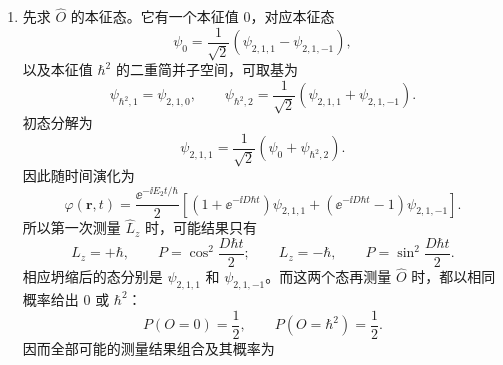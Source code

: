 \begin{question}
\begin{solution}
\begin{enumerate}[label=(\arabic*),leftmargin=2.5em]
  \item 先求 $\hat O$ 的本征态。它有一个本征值 $0$，对应本征态
  \[
  \psi_{0}=\frac{1}{\sqrt2}(\psi_{2,1,1}-\psi_{2,1,-1}),
  \]
  以及本征值 $\hbar^2$ 的二重简并子空间，可取基为
  \[
  \psi_{\hbar^2,1}=\psi_{2,1,0},
  \qquad
  \psi_{\hbar^2,2}=\frac{1}{\sqrt2}(\psi_{2,1,1}+\psi_{2,1,-1}).
  \]
  初态分解为
  \[
  \psi_{2,1,1}=\frac{1}{\sqrt2}(\psi_0+\psi_{\hbar^2,2}).
  \]
  因此随时间演化为
  \[
  \varphi(\mathbf r,t)=\frac{\ee^{-\ii E_2 t/\hbar}}{2}
  \left[(1+\ee^{-\ii D\hbar t})\psi_{2,1,1}+(\ee^{-\ii D\hbar t}-1)\psi_{2,1,-1}\right].
  \]
  所以第一次测量 $\hat L_z$ 时，可能结果只有
  \[
  L_z=+\hbar,\qquad P=\cos^2\frac{D\hbar t}{2};
  \qquad
  L_z=-\hbar,\qquad P=\sin^2\frac{D\hbar t}{2}.
  \]
  相应坍缩后的态分别是 $\psi_{2,1,1}$ 和 $\psi_{2,1,-1}$。而这两个态再测量 $\hat O$ 时，都以相同概率给出 $0$ 或 $\hbar^2$：
  \[
  P(O=0)=\frac12,
  \qquad
  P(O=\hbar^2)=\frac12.
  \]
  因而全部可能的测量结果组合及其概率为
\end{enumerate}
\end{solution}
\end{question}


